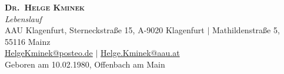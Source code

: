 \documentclass[a4paper,11pt]{article}
\begin{document}

\begin{center}
    \textbf{\Huge \scshape Dr.\ Helge Kminek} \\ \vspace{3pt}
    \small\textit{Lebenslauf} \\ \vspace{6pt}
    \small
    \faMapMarker \hspace{.5pt} AAU Klagenfurt, Sterneckstra{\ss}e 15, A-9020 Klagenfurt
    $|$
    \faMapMarker \hspace{.5pt} Mathildenstra{\ss}e 5, 55116 Mainz
    \\ \vspace{3pt}
    \faAt \hspace{.5pt} \href{mailto:HelgeKminek@posteo.de}{HelgeKminek@posteo.de}
    $|$
    \faAt \hspace{.5pt} \href{mailto:Helge.Kminek@aau.at}{Helge.Kminek@aau.at}
    \\ \vspace{3pt}
    Geboren am 10.02.1980, Offenbach am Main
\end{center}


\end{document}
